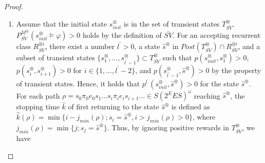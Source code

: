\documentclass[10pt]{article}
\theoremstyle{definition}
\begin{document}
\begin{proof}
\begin{enumerate}
  \item Assume that the initial state $s^{\otimes}_{init}$ is in the set of transient states $T_{\bar{SV}}^{\otimes}$.$P^{M^{\otimes}}_{\bar{SV}}(s^{\otimes}_{init} \models \varphi) > 0$ holds by the definition of $\bar{SV}$. For an accepting recurrent class $R^{\otimes i}_{\bar{SV}}$, there exist a number $l^{\prime} > 0$, a state $\hat{s}^{\otimes}$ in $Post(T^{\otimes}_{\bar{SV}}) \cap R^{\otimes i}_{\bar{SV}}$, and a subset of transient states $\{ s^{\otimes}_1, \ldots , s^{\otimes}_{l^{\prime}-1} \} \subset T^{\otimes}_{\bar{SV}}$ such that $p(s^{\otimes}_{init}, s^{\otimes}_1)>0$, $p(s^{\otimes}_{i}, s^{\otimes}_{i+1})>0$ for $i \in \{ 1,...,l^{\prime}-2 \}$, and $p(s^{\otimes}_{l^{\prime}-1}, \hat{s}^{\otimes})>0$ by the property of transient states.
    Hence, it holds that $p^{l^{\prime}}(s^{\otimes}_{init}, \hat{s}^{\otimes}) > 0$ for the state $\hat{s}^{\otimes}$. For each path $\rho = s_0 \pi_0 e_0 s_1 \ldots s_i \pi_i e_i s_{i+1} \ldots \in S (2^E E S)^{\omega}$ reaching $\hat{s}^{\otimes}$, the stopping time $\hat{k}$ of first returning to the state $\hat{s}^{\otimes}$ is defined as $\hat{k}(\rho) = \min \{ i - j_{min}(\rho) ; s_i = \hat{s}^{\otimes}, i>j_{min}(\rho)>0 \}$, where $j_{min}(\rho) = \min \{ j ; s_j = \hat{s}^{\otimes} \}$. Thus, by ignoring positive rewards in $T^{\otimes}_{\bar{SV}}$, we have



\end{enumerate}
\end{proof}
\end{document}
